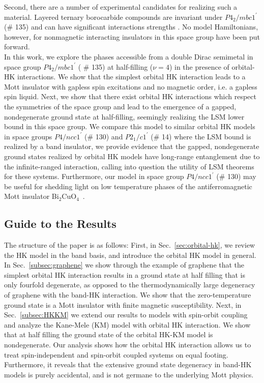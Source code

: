 \documentclass[prb,aps,amssymb,twocolumn,notitlepage]{revtex4-2}
\def\sg135{$P4_2/mbc1^\prime$ (\# 135)}
\begin{document}
Second, there are a number of experimental candidates for realizing such a material.
Layered ternary borocarbide compounds are invariant under \sg135 and can have significant interactions strengths \cite{wiitkarborocarbide1994}.
No model Hamiltonians, however, for nonmagnetic interacting insulators in this space group have been put forward.\\

\indent In this work, we explore the phases accessible from a double Dirac semimetal in space group $P4_2/mbc1^\prime$ (
\# 135) at half-filling ($\nu=4$) in the presence of orbital-HK interactions. 
We show that the simplest orbital HK interaction leads to a Mott insulator with gapless spin excitations and no magnetic order, i.e. a gapless spin liquid. 
Next, we show that there exist orbital HK interactions which respect the symmetries of the space group and lead to the emergence of a gapped, nondegenerate ground state at half-filling, seemingly realizing the LSM lower bound in this space group. 
We compare this model to similar orbital HK models in space groups $P4/ncc1^\prime$ (\# 130) and $P2_1/c1^\prime$ (\# 14) where the LSM bound is realized by a band insulator, we provide evidence that the gapped, nondegenerate ground states realized by orbital HK models have long-range entanglement due to the infinite-ranged interaction, calling into question the utility of LSM theorems for these systems. Furthermore, our model in space group $P4/ncc1^\prime$ (\# 130) may be useful for shedding light on low temperature phases of the antiferromagnetic Mott insulator Bi$_2$CuO$_4$~\cite{bradlyn2016dirac,disante2017realizing}.

\subsection*{Guide to the Results}

The structure of the paper is as follows: First, in Sec.~\ref{sec:orbital-hk}, we review the HK model in the band basis, and introduce the orbital HK model in general. 
In Sec.~\ref{subsec:graphene} we show through the example of graphene that the simplest orbital HK interaction results in a ground state at half filling that is only fourfold degenerate, as opposed to the thermodynamically large degeneracy of graphene with the band-HK interaction. 
We show that the zero-temperature ground state is a Mott insulator with finite magnetic susceptibility. 
Next, in Sec.~\ref{subsec:HKKM} we extend our results to models with spin-orbit coupling and analyze the Kane-Mele (KM) model with orbital HK interaction. 
We show that at half filling the ground state of the orbital HK-KM model is nondegenerate. 
Our analysis shows how the orbital HK interaction allows us to treat spin-independent and spin-orbit coupled systems on equal footing. 
Furthermore, it reveals that the extensive ground state degeneracy in band-HK models is purely accidental, and is not germane to the underlying Mott physics.
\end{document}
